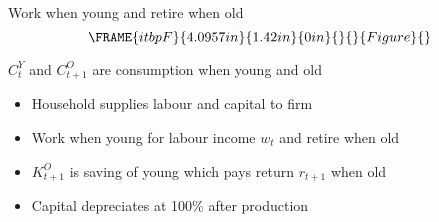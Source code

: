 \documentclass[notes=show]{beamer}
\begin{document}
\begin{frame}%


\begin{center}
Work when young and retire when old%
\begin{equation*}
\FRAME{itbpF}{4.0957in}{1.42in}{0in}{}{}{Figure}{\special{language
"Scientific Word";type "GRAPHIC";maintain-aspect-ratio TRUE;display
"USEDEF";valid_file "T";width 4.0957in;height 1.42in;depth
0in;original-width 13.5559in;original-height 4.6389in;cropleft "0";croptop
"1";cropright "1";cropbottom "0";tempfilename
'PEZU5W05.bmp';tempfile-properties "XPR";}}
\end{equation*}

$C_{t}^{Y}$ and $C_{t+1}^{O}$ are consumption when young and old
\end{center}

\transboxout%
\end{frame}%

\begin{frame}%


\begin{itemize}
\item Household supplies labour and capital to firm

\item Work when young for labour income $w_{t}$ and retire when old

\item $K_{t+1}^{O}$ is saving of young which pays return $r_{t+1}$ when old

\item Capital depreciates at 100\% after production
\end{itemize}

\transboxout%
\end{frame}%
\end{document}
